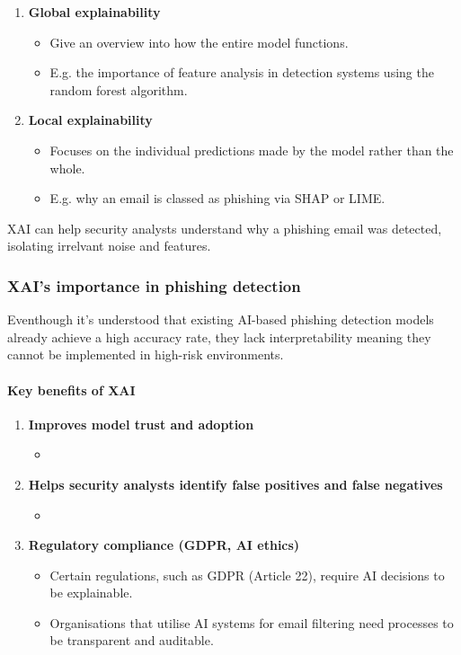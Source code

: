 \begin{enumerate}
    \item \textbf{Global explainability}
    \begin{itemize}
        \item Give an overview into how the entire model functions.
        \item E.g. the importance of feature analysis in detection systems using the random forest algorithm.
    \end{itemize}
    \item \textbf{Local explainability}
    \begin{itemize}
        \item Focuses on the individual predictions made by the model rather than the whole.
        \item E.g. why an email is classed as phishing via SHAP or LIME.
    \end{itemize}
\end{enumerate}

\noindent XAI can help security analysts understand why a phishing email was detected, isolating irrelvant noise and features.

\subsubsection*{XAI's importance in phishing detection}
Eventhough it's understood that existing AI-based phishing detection models already achieve a high accuracy rate, they lack interpretability meaning they cannot be implemented in high-risk environments.

\paragraph{Key benefits of XAI}
\begin{enumerate}
    \item \textbf{Improves model trust and adoption}
    \begin{itemize}
        \item 
    \end{itemize}
    \item \textbf{Helps security analysts identify false positives and false negatives}
    \begin{itemize}
        \item 
    \end{itemize}
    \item \textbf{Regulatory compliance (GDPR, AI ethics)}
    \begin{itemize}
        \item Certain regulations, such as GDPR (Article 22), require AI decisions to be explainable.
        \item Organisations that utilise AI systems for email filtering need processes to be transparent and auditable.
    \end{itemize}
\end{enumerate}

